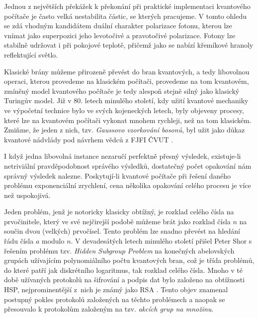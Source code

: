 \documentclass[12pt]{report}
\begin{document}
Jednou z největších překážek k překonání při praktické implementaci kvantového počítače je často velká nestabilita částic, se kterých pracujeme. V tomto ohledu se zdá vhodným kandidátem duální charakter polarizace fotonu, kterou lze vnímat jako superpozici jeho levotočivé a pravotočivé polarizace. Fotony lze stabilně udržovat i při pokojové teplotě, přičemž jako  se nabízí křemíkové hranoly reflektující světlo.

Klasické brány můžeme přirozeně převést do bran kvantových, a tedy libovolnou operaci, kterou provedeme na klasickém počítači, provedeme na tom kvantovém, zmíněný model kvantového počítače je tedy alespoň stejně silný jako klasický Turingův model. Již v $80$. letech minulého století, kdy užití kvantové mechaniky ve výpočetní technice bylo ve svých kojeneckých letech, byly objeveny procesy, které lze na kvantovém počítači vykonat mnohem rychleji, než na tom klasickém. Zmiňme, že jeden z nich, tzv. \textit{Gaussovo vzorkování bosonů}, byl užit jako důkaz kvantové nádvlády pod návrhem vědců z FJFI ČVUT \cite{Science}.

I když jedna libovolná instance nezaručí perfektně přesný výsledek, existuje-li netriviální pravděpodobnost správého výsledků, dostatečný počet opakování nám správný výsledek nalezne. Poskytují-li kvantové počítače při řešení daného problému exponenciální zrychlení, cena několika opakování celého procesu je více než uspokojivá.


Jeden problém, jenž je notoricky klasicky obtížný, je rozklad celého čísla na prvočinitele, který ve své nejčirejší podobě můžeme brát jako rozklad čísla $n$ na součin dvou (velkých) prvočísel. Tento problém lze snadno převést na hledání řádu čísla $a$ modulo $n$. V devadesátých letech minulého století přišel Peter Shor \cite{Shor} s řešením problému tzv. \textit{Hidden Subgroup Problem} na konečných abelovských grupách užívajícím polynomiálního počtu kvantových bran, což je třída problémů, do které patří jak diskrétního logaritmus, tak rozklad celého čísla. Mnoho v té době užívaných protokolů na šifrování a podpis dat bylo založeno na obtížnosti HSP, nejprominentější z~nich je známý jako RSA \cite{RSA}. Tento objev znamenal postupný pokles protokolů založených na těchto problémech a naopak se přesouvalo k protokolům založeným na tzv. \textit{akcích grup na množinu}.
\end{document}
